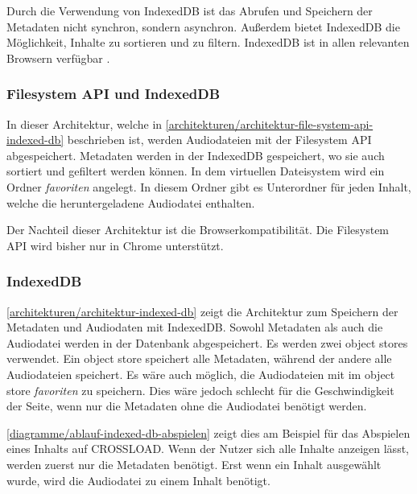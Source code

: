 Durch die Verwendung von IndexedDB ist das Abrufen und Speichern der Metadaten nicht synchron, sondern asynchron. Außerdem bietet IndexedDB die Möglichkeit, Inhalte zu sortieren und zu filtern. IndexedDB ist in allen relevanten Browsern verfügbar .

\subsubsection{Filesystem API und IndexedDB}

In dieser Architektur, welche in \autoref{architekturen/architektur-file-system-api-indexed-db} beschrieben ist, werden Audiodateien mit der Filesystem \ac{API} abgespeichert. Metadaten werden in der IndexedDB gespeichert, wo sie auch sortiert und gefiltert werden können. In dem virtuellen Dateisystem wird ein Ordner \textit{favoriten} angelegt. In diesem Ordner gibt es Unterordner für jeden Inhalt, welche die heruntergeladene Audiodatei enthalten. 

Der Nachteil dieser Architektur ist die Browserkompatibilität. Die Filesystem \ac{API} wird bisher nur in Chrome unterstützt.

\subsubsection{IndexedDB}

\autoref{architekturen/architektur-indexed-db} zeigt die Architektur zum Speichern der Metadaten und Audiodaten mit IndexedDB. Sowohl Metadaten als auch die Audiodatei werden in der Datenbank abgespeichert. Es werden zwei object stores verwendet. Ein object store speichert alle Metadaten, während der andere alle Audiodateien speichert. Es wäre auch möglich, die Audiodateien mit im object store \textit{favoriten} zu speichern. Dies wäre jedoch schlecht für die Geschwindigkeit der Seite, wenn nur die Metadaten ohne die Audiodatei benötigt werden.

\autoref{diagramme/ablauf-indexed-db-abspielen} zeigt dies am Beispiel für das Abspielen eines Inhalts auf CROSSLOAD. Wenn der Nutzer sich alle Inhalte anzeigen lässt, werden zuerst nur die Metadaten benötigt. Erst wenn ein Inhalt ausgewählt wurde, wird die Audiodatei zu einem Inhalt benötigt. 


